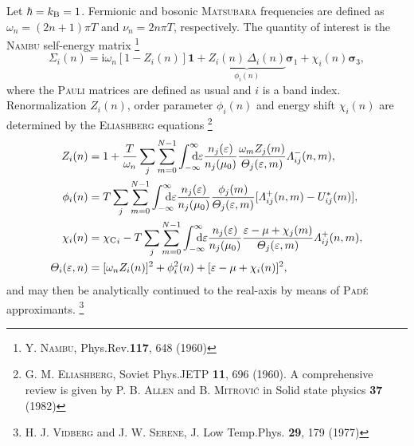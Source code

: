 \documentclass[a4paper]{article}
\def\D{\mathrm d}
\def\I{\mathrm i}
\def\sub#1{\sb{\mathrm{#1}}}
\def\from#1{\sb{\mathrlap{#1}}}
\def\till#1{\sp{\mathrlap{#1}}}
\let\vec\boldsymbol
\let\Delta\varDelta
\let\epsilon\varepsilon
\let\Lambda\varLambda
\let\Sigma\varSigma
\let\Theta\varTheta
\begin{document}
   Let $\hbar = k \sub B = 1$. Fermionic and bosonic \textsc{Matsubara}
   frequencies are defined as $\omega_n = (2 n + 1) \pi T$ and $\nu_n = 2 n \pi
   T$, respectively. The quantity of interest is the \textsc{Nambu} self-energy
   matrix%
   \footnote{Y. \textsc{Nambu}, Phys.\@ Rev.\@ \textbf{117}, 648 (1960)}
   \begin{equation*}
      \vec \Sigma_i(n)
      = \I \omega_n [1 - Z_i(n)] \vec 1
      + \underbrace{Z_i(n) \, \Delta_i(n)}
      _ {\displaystyle \phi_i(n)} \vec \sigma_1
      + \chi_i(n) \vec \sigma_3,
   \end{equation*}
   where the \textsc{Pauli} matrices are defined as usual and $i$ is a band
   index. Renormalization $Z_i(n)$, order parameter $\phi_i(n)$ and energy shift
   $\chi_i(n)$ are determined by the \textsc{Eliashberg} equations%
   \footnote{%
      G. M. \textsc{Eliashberg}, Soviet Phys.\@ JETP \textbf{11}, 696 (1960).
      \newline
      A comprehensive review is given by P. B. \textsc{Allen} and B.
      \textsc{Mitrović} in Solid state physics \textbf{37} (1982)
      }
   \begin{equation}
      \begin{split}
         Z_i(n) &= 1 + \frac T {\omega_n} \sum_j \sum_{m = 0}^{N - 1}
         \int \from{-\infty} \till \infty \D \epsilon
         \frac{n_j(\epsilon)}{n_j(\mu_0)}
         \frac{\omega_m Z_j(m)}{\Theta_j(\epsilon, m)}
         \Lambda_{i j}^-(n, m),
         \\
         \phi_i(n) &= T \sum_j \sum_{m = 0}^{N - 1}
         \int \from{-\infty} \till \infty \D \epsilon
         \frac{n_j(\epsilon)}{n_j(\mu_0)}
         \frac{\phi_j(m)}{\Theta_j(\epsilon, m)}
         [\Lambda_{i j}^+(n, m) - U^*_{i j}(m)],
         \\
         \chi_i(n) &= {\chi \sub C}_i - T \sum_j \sum_{m = 0}^{N - 1}
         \int \from{-\infty} \till \infty \D \epsilon
         \frac{n_j(\epsilon)}{n_j(\mu_0)}
         \frac{\epsilon - \mu + \chi_j(m)}{\Theta_j(\epsilon, m)}
         \Lambda_{i j}^+(n, m),
         \\
         \Theta_i(\epsilon, n) &=
         [\omega_n Z_i(n)]^2 + \phi_i^2(n) + [\epsilon - \mu + \chi_i(n)]^2,
      \end{split}
      \label{Eliashberg equations}
   \end{equation}
   and may then be analytically continued to the real-axis by means of
   \textsc{Padé} approximants.%
   \footnote{%
      H. J. \textsc{Vidberg} and J. W. \textsc{Serene}, J. Low Temp.\@ Phys.\@
      \textbf{29}, 179 (1977)
      }
\end{document}
